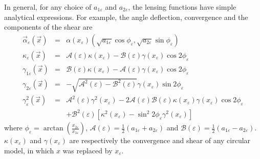 \noindent In general, for any choice of $a_{1\varepsilon}$ and
$a_{2\varepsilon}$, the lensing functions have simple analytical expressions.
For example, the angle deflection, convergence and the components of the
shear are 
\begin{eqnarray}
\vec{\alpha}_\varepsilon(\vec{x})&=&\alpha(x_\varepsilon)(\sqrt{a_{1\varepsilon}
} \cos { \phi_ \varepsilon},\sqrt{a_{2\varepsilon}}\sin{\phi_\varepsilon})
\label{ang_def_pe}\\
\kappa_\varepsilon(\vec{x})&=&\mathcal{A}(\varepsilon)\kappa(x_\varepsilon)
-\mathcal{B}(\varepsilon)\gamma(x_\varepsilon)\cos{2\phi_\varepsilon}
\label{kappa_pe}\\
\gamma_{1\varepsilon}(\vec{x})& = &
\mathcal{B}(\varepsilon)\kappa(x_\varepsilon)-\mathcal{A}
(\varepsilon)\gamma(x_\varepsilon)\cos{2\phi_\varepsilon} \\
\gamma_{2\varepsilon}(\vec{x})& =
&-\sqrt{\mathcal{A}^2(\varepsilon)-\mathcal{B}^2(\varepsilon)}
\gamma(x_\varepsilon)\sin{ 2\phi_\varepsilon}\\
\gamma^2_\varepsilon(\vec{x}) & = &
\mathcal{A}^2(\varepsilon)\gamma^2(x_\varepsilon)-2\mathcal{A}
(\varepsilon)\mathcal {B}
(\varepsilon)\kappa(x_\varepsilon)\gamma(x_\varepsilon)\cos{2\phi_\varepsilon}
\nonumber  \\ &  &
+\mathcal{B}^2(\varepsilon)[\kappa^2(x_\varepsilon)-\sin^2{2\phi_\varepsilon}
\gamma^2(x_\varepsilon) ]\label{gamma_pe}
\end{eqnarray}
\noindent where
$\phi_\varepsilon=\arctan(\frac{x_{2\varepsilon}}{x_{1\varepsilon}})$,
$\mathcal{A(\varepsilon)}=\frac{1}{2}(a_{1\varepsilon}+a_{2\varepsilon})$ and
$\mathcal{B}(\varepsilon)=\frac{1}{2}(a_{1\varepsilon}-a_{2\varepsilon})$.
$\kappa(x_\varepsilon)$
and $\gamma(x_\varepsilon)$ are respectively the convergence and shear of any
circular model, in
which $x$ was replaced by $x_\varepsilon$.


